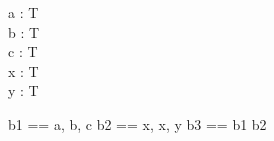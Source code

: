 \documentclass[a4paper,10pt,fleqn]{article}
\begin{document}
\begin{zed}
[T]
\end{zed}

\begin{axdef}
a : T \\
b : T \\
c : T \\
x : T \\
y : T
\end{axdef}

\begin{zed}
b1 == \lbag a, b, c \rbag
\also
b2 == \lbag x, x, y \rbag
\also
b3 == b1 \uplus b2
\end{zed}
\end{document}
